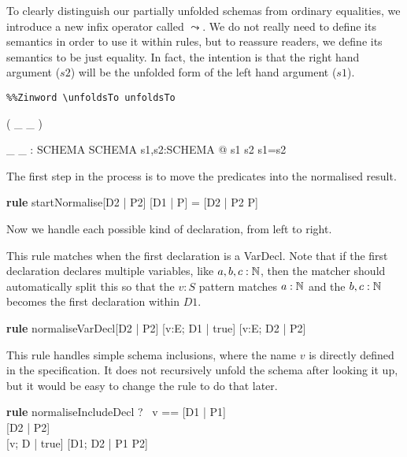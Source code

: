 \documentclass{article}
\newcommand{\relation}{\mathrel{\textbf{relation}}}
\newenvironment{zedrule}[1]{\par\textbf{rule }#1\vspace{-1ex}\infrule}{\endinfrule}
\newcommand{\derives}{\derive{}}
\newcommand{\proviso}{\raisebox{0.5ex}{${}_{\blacktriangleright}\ $}}%
\begin{document}
\newcommand{\unfoldsTo}{\mathrel{\leadsto}}

To clearly distinguish our partially unfolded schemas from ordinary
equalities, we introduce a new infix operator called $\unfoldsTo$.  We
do not really need to define its semantics in order to use it within
rules, but to reassure readers, we define its semantics to be just
equality.  In fact, the intention is that the right hand argument
($s2$) will be the unfolded form of the left hand argument ($s1$).

\begin{verbatim}
%%Zinword \unfoldsTo unfoldsTo
\end{verbatim}

\begin{zed}
  \relation ( \_ \unfoldsTo \_ )
\end{zed}

\begin{gendef}[SCHEMA]
  \_ \unfoldsTo \_ : SCHEMA \rel SCHEMA
\where
  \forall s1,s2:SCHEMA @ s1 \unfoldsTo s2 \iff s1=s2
\end{gendef}

The first step in the process is to move the predicates into
the normalised result.
\begin{zedrule}{startNormalise}
   [D1 | true] \unfoldsTo [D2 | P2]
\derives
   [D1 | P] = [D2 | P2 \land P]
\end{zedrule}

Now we handle each possible kind of declaration, from left to right.

This rule matches when the first declaration is a VarDecl.
Note that if the first declaration declares multiple variables,
like $a,b,c:{\mathbb N}$, then the matcher should automatically split this
so that the $v:S$ pattern matches $a:{\mathbb N}$ and the $b,c:{\mathbb N}$
becomes the first declaration within $D1$.
\begin{zedrule}{normaliseVarDecl}
   [D1 | true] \unfoldsTo [D2 | P2]
\derives
   [v:E; D1 | true] \unfoldsTo [v:E; D2 | P2]
\end{zedrule}

This rule handles simple schema inclusions, where the name
$v$ is directly defined in the specification.  It does not
recursively unfold the schema after looking it up, but it would
be easy to change the rule to do that later.
\begin{zedrule}{normaliseIncludeDecl}
   \proviso ?~ v == [D1 | P1] \\
   [D | true] \unfoldsTo [D2 | P2] \\
\derives
   [v; D | true] \unfoldsTo [D1; D2 | P1 \land P2]
\end{zedrule}
\end{document}
